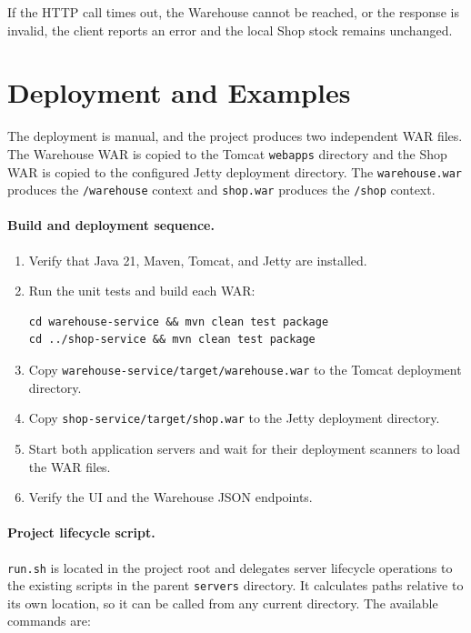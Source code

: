 \documentclass[12pt,a4paper]{article}
\begin{document}
If the HTTP call times out, the Warehouse cannot be reached, or the response is invalid, the client reports an error and the local Shop stock remains unchanged.

\section{Deployment and Examples}

The deployment is manual, and the project produces two independent WAR files. The Warehouse WAR is copied to the Tomcat \texttt{webapps} directory and the Shop WAR is copied to the configured Jetty deployment directory.
The \texttt{warehouse.war} produces the \texttt{/warehouse} context and
\texttt{shop.war} produces the \texttt{/shop} context.

\paragraph{Build and deployment sequence.}

\begin{enumerate}
    \item Verify that Java 21, Maven, Tomcat, and Jetty are installed.
    \item Run the unit tests and build each WAR:
\begin{Verbatim}
cd warehouse-service && mvn clean test package
cd ../shop-service && mvn clean test package
\end{Verbatim}
    \item Copy \texttt{warehouse-service/target/warehouse.war} to the
    Tomcat deployment directory.
    \item Copy \texttt{shop-service/target/shop.war} to the Jetty deployment
    directory.
    \item Start both application servers and wait for their deployment
    scanners to load the WAR files.
    \item Verify the UI and the Warehouse JSON endpoints.
\end{enumerate}

\paragraph{Project lifecycle script.}

\texttt{run.sh} is located in the project root and delegates server lifecycle
operations to the existing scripts in the parent \texttt{servers} directory.
It calculates paths relative to its own location, so it can be called from
any current directory. The available commands are:
\end{document}
